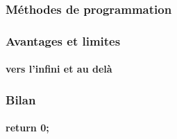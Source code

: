 \documentclass{beamer}
\begin{document}
    \begin{frame}
    \frametitle{Méthodes de programmation}
    \framesubtitle{}
    \end{frame}


    \begin{frame}
    \frametitle{Avantages et limites}
    \framesubtitle{vers l'infini et au delà}
    \end{frame}


    \begin{frame}
    \frametitle{Bilan}
    \framesubtitle{return 0;}
    \end{frame}



\end{document}
